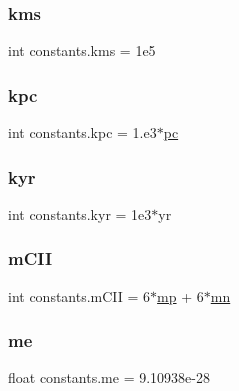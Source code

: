 \subsubsection{\texorpdfstring{kms}{kms}}
{\footnotesize\ttfamily int constants.\+kms = 1e5}

\mbox{\label{namespaceconstants_ad91def68fa6a3afee415cc69061a7583}} 
\subsubsection{\texorpdfstring{kpc}{kpc}}
{\footnotesize\ttfamily int constants.\+kpc = 1.e3$\ast$\hyperlink{namespaceconstants_a93c63f6ed8c5e300d378f5e4007f9b6d}{pc}}

\mbox{\label{namespaceconstants_ab5bb5ac138ecb54ccd663804b1c3ab9c}} 
\subsubsection{\texorpdfstring{kyr}{kyr}}
{\footnotesize\ttfamily int constants.\+kyr = 1e3$\ast$yr}

\mbox{\label{namespaceconstants_a4039b9e829bd537908aaf35345f3d434}} 
\subsubsection{\texorpdfstring{m\+C\+II}{mCII}}
{\footnotesize\ttfamily int constants.\+m\+C\+II = 6$\ast$\hyperlink{namespaceconstants_aebdc70445dfb9e72960792ba2efe97ab}{mp} + 6$\ast$\hyperlink{namespaceconstants_ad53f198771c37114065171d857217e26}{mn}}

\mbox{\label{namespaceconstants_a5103d84ddd0c3eff4199593db0a5d88d}} 
\subsubsection{\texorpdfstring{me}{me}}
{\footnotesize\ttfamily float constants.\+me = 9.\+10938e-\/28}

